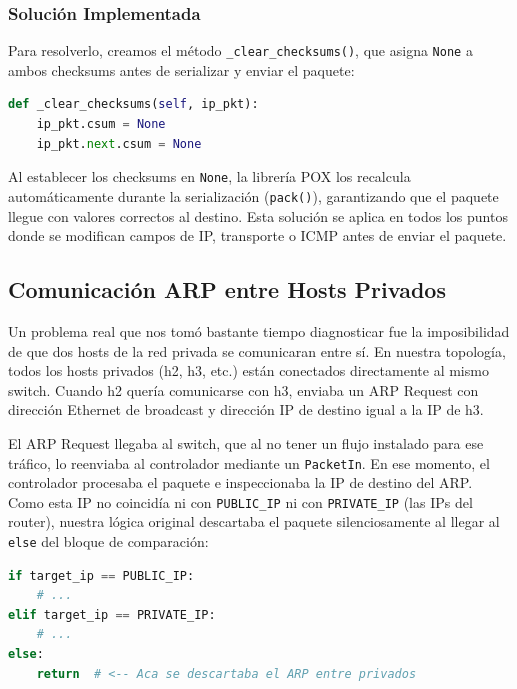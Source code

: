 \documentclass[11pt, a4paper]{article}
\begin{document}
\subsubsection{Solución Implementada}

Para resolverlo, creamos el método \texttt{\_clear\_checksums()}, que asigna \texttt{None} a ambos checksums antes de serializar y enviar el paquete:

\begin{lstlisting}[language=Python, caption=Método \texttt{\_clear\_checksums} en \texttt{protorouter.py}.]
def _clear_checksums(self, ip_pkt):
    ip_pkt.csum = None
    ip_pkt.next.csum = None
\end{lstlisting}

Al establecer los checksums en \texttt{None}, la librería POX los recalcula automáticamente durante la serialización (\texttt{pack()}), garantizando que el paquete llegue con valores correctos al destino. Esta solución se aplica en todos los puntos donde se modifican campos de IP, transporte o ICMP antes de enviar el paquete.

\subsection{Comunicación ARP entre Hosts Privados}

Un problema real que nos tomó bastante tiempo diagnosticar fue la imposibilidad de que dos hosts de la red privada se comunicaran entre sí. En nuestra topología, todos los hosts privados (h2, h3, etc.) están conectados directamente al mismo switch. Cuando h2 quería comunicarse con h3, enviaba un ARP Request con dirección Ethernet de broadcast y dirección IP de destino igual a la IP de h3.

El ARP Request llegaba al switch, que al no tener un flujo instalado para ese tráfico, lo reenviaba al controlador mediante un \texttt{PacketIn}. En ese momento, el controlador procesaba el paquete e inspeccionaba la IP de destino del ARP. Como esta IP no coincidía ni con \texttt{PUBLIC\_IP} ni con \texttt{PRIVATE\_IP} (las IPs del router), nuestra lógica original descartaba el paquete silenciosamente al llegar al \texttt{else} del bloque de comparación:

\begin{lstlisting}[language=Python, caption=Lógica original que descartaba ARP entre privados.]
if target_ip == PUBLIC_IP:
    # ...
elif target_ip == PRIVATE_IP:
    # ...
else:
    return  # <-- Aca se descartaba el ARP entre privados
\end{lstlisting}
\end{document}
